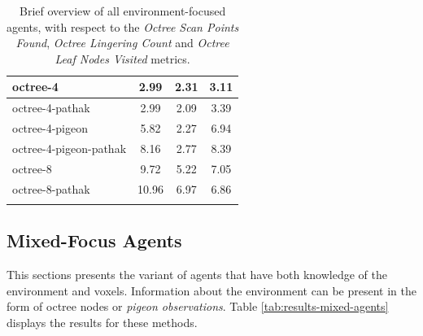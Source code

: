 \begin{longtable}{|l|c|c|c|}
octree-4 & 2.99 & {\cellcolor[HTML]{EBF2F0}} \color[HTML]{000000} 2.31 & 3.11 \\ \hline
octree-4-pathak & 2.99 & {\cellcolor[HTML]{EBF2F0}} \color[HTML]{000000} 2.09 & 3.39 \\ \hline
octree-4-pigeon & 5.82 & {\cellcolor[HTML]{EBF2F0}} \color[HTML]{000000} 2.27 & 6.94 \\ \hline
octree-4-pigeon-pathak & 8.16 & {\cellcolor[HTML]{E8F1EF}} \color[HTML]{000000} 2.77 & 8.39 \\ \hline
octree-8 & 9.72 & {\cellcolor[HTML]{DDEBE8}} \color[HTML]{000000} 5.22 & 7.05 \\ \hline
octree-8-pathak & 10.96 & {\cellcolor[HTML]{D5E7E3}} \color[HTML]{000000} 6.97 & 6.86 \\ \hline


    \caption{Brief overview of all environment-focused agents, with respect to the \textit{Octree Scan Points Found}, \textit{Octree Lingering Count} and \textit{Octree Leaf Nodes Visited} metrics.}
    \label{tab:RQ2-results-comparative-voxeloctree}
\end{longtable}

\newpage

\subsection{Mixed-Focus Agents}
This sections presents the variant of agents that have both knowledge of the environment and voxels. Information about the environment can be present in the form of octree nodes or \textit{pigeon observations}. Table \ref{tab:results-mixed-agents} displays the results for these methods.

